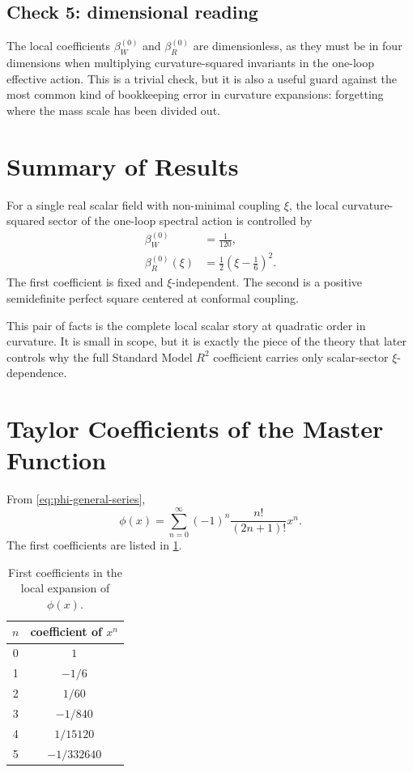 \documentclass[11pt,a4paper]{article}
\theoremstyle{definition}
\theoremstyle{remark}
\begin{document}
\subsection{Check 5: dimensional reading}

The local coefficients $\beta_W^{(0)}$ and $\beta_R^{(0)}$ are dimensionless,
as they must be in four dimensions when multiplying curvature-squared
invariants in the one-loop effective action.  This is a trivial check, but it
is also a useful guard against the most common kind of bookkeeping error in
curvature expansions: forgetting where the mass scale has been divided out.

\section{Summary of Results}
\label{sec:summary}

For a single real scalar field with non-minimal coupling $\xi$, the local
curvature-squared sector of the one-loop spectral action is controlled by
\begin{align}
  \beta_W^{(0)} &= \frac{1}{120},
  \label{eq:summary-betaW}\\[4pt]
  \beta_R^{(0)}(\xi)
  &= \frac{1}{2}\left(\xi - \frac{1}{6}\right)^2.
  \label{eq:summary-betaR}
\end{align}
The first coefficient is fixed and $\xi$-independent.  The second is a
positive semidefinite perfect square centered at conformal coupling.

This pair of facts is the complete local scalar story at quadratic order in
curvature.  It is small in scope, but it is exactly the piece of the theory
that later controls why the full Standard Model $R^2$ coefficient carries
only scalar-sector $\xi$-dependence.

\appendix

\section{Taylor Coefficients of the Master Function}
\label{app:taylor}

From \eqref{eq:phi-general-series},
\begin{equation}
  \phi(x)
  = \sum_{n=0}^{\infty}
    (-1)^n\frac{n!}{(2n+1)!}x^n.
  \label{eq:appendix-series}
\end{equation}
The first coefficients are listed in \cref{tab:taylor}.

\begin{table}[ht]
\centering
\caption{First coefficients in the local expansion of $\phi(x)$.}
\label{tab:taylor}
\begin{tabular}{cc}
\toprule
$n$ & coefficient of $x^n$ \\
\midrule
0 & $1$ \\
1 & $-1/6$ \\
2 & $1/60$ \\
3 & $-1/840$ \\
4 & $1/15120$ \\
5 & $-1/332640$ \\
\bottomrule
\end{tabular}
\end{table}
\end{document}
